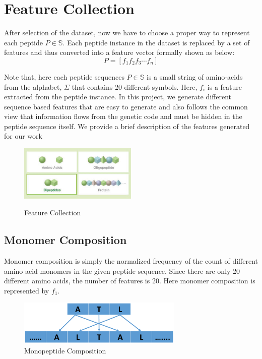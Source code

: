 \section{Feature Collection}
After selection of the dataset, now we have to choose a proper way to represent each peptide $P\in \mathbb{S}$. Each peptide instance in the dataset is replaced by a set of features and thus converted into a feature vector formally shown as below:
$$P=[ f_1 f_2 f_3 \cdots f_n]$$

Note that, here each peptide sequences $P \in \mathbb{S}$ is a small string of amino-acids from the alphabet, $\Sigma$ that contains 20 different symbols. Here, $f_i$ is a feature extracted from the peptide instance. In this project, we generate different sequence based features that are easy to generate and also follows the common view that information flows from the genetic code and must be hidden in the peptide sequence itself. We provide a brief description of the features generated for our work

\begin{figure}[H]
\centering
 \includegraphics[width=0.5\textwidth]{f1.eps}
 \caption{Feature Collection}\cite{Anderson06}
\end{figure}

\subsection{Monomer Composition}
Monomer composition is simply the normalized frequency of the count of different amino acid monomers in the given peptide sequence. Since there are only 20 different amino acids, the number of features is 20. Here monomer composition is represented by $f_1$.

\begin{figure}[h]
\centering
 \includegraphics[width=0.7\textwidth]{mononew.eps}
 \caption{Monopeptide Composition}
\end{figure}

